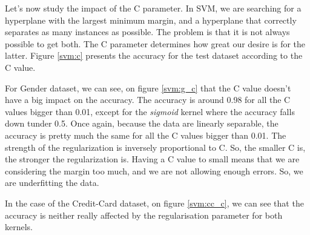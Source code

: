 \documentclass[10pt]{article}
\begin{document}
			Let's now study the impact of the C parameter. In SVM, we are searching for a hyperplane with the largest minimum margin, and a hyperplane that correctly separates as many instances as possible. The problem is that it is not always possible to get both. The C parameter determines how great our desire is for the latter. Figure \ref{svm:c} presents the accuracy for the test dataset according to the C value.

			For Gender dataset, we can see, on figure \ref{svm:g_c} that the C value doesn't have a big impact on the accuracy. The accuracy is around 0.98 for all the C values bigger than 0.01, except for the \textit{sigmoid} kernel where the accuracy falls down tunder 0.5. Once again, because the data are linearly separable, the accuracy is pretty much the same for all the C values bigger than 0.01.
			The strength of the regularization is inversely proportional to C. So, the smaller C is, the stronger the regularization is. Having a C value to small means that we are considering the margin too much, and we are not allowing enough errors. So, we are underfitting the data.

			In the case of the Credit-Card dataset, on figure \ref{svm:cc_c}, we can see that the accuracy is neither really affected by the regularisation parameter for both kernels.
\end{document}
